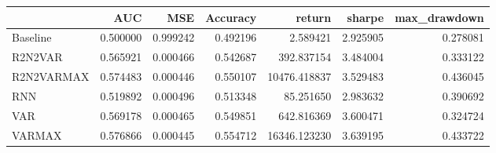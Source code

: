 \begin{tabular}{lrrrrrr}
\toprule
{} &       AUC &       MSE &  Accuracy &        return &    sharpe &  max\_drawdown \\
\midrule
Baseline   &  0.500000 &  0.999242 &  0.492196 &      2.589421 &  2.925905 &      0.278081 \\
R2N2VAR    &  0.565921 &  0.000466 &  0.542687 &    392.837154 &  3.484004 &      0.333122 \\
R2N2VARMAX &  0.574483 &  0.000446 &  0.550107 &  10476.418837 &  3.529483 &      0.436045 \\
RNN        &  0.519892 &  0.000496 &  0.513348 &     85.251650 &  2.983632 &      0.390692 \\
VAR        &  0.569178 &  0.000465 &  0.549851 &    642.816369 &  3.600471 &      0.324724 \\
VARMAX     &  0.576866 &  0.000445 &  0.554712 &  16346.123230 &  3.639195 &      0.433722 \\
\bottomrule
\end{tabular}
